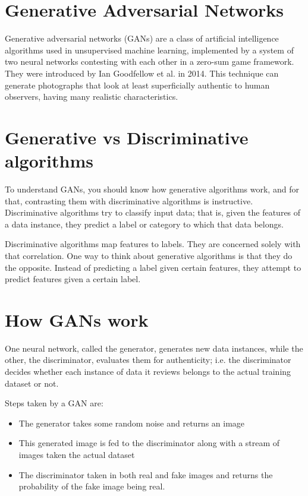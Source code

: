     \section{Generative Adversarial Networks}
    Generative adversarial networks (GANs) are a class of artificial intelligence 
    algorithms used in unsupervised machine learning, implemented by a system of 
    two neural networks contesting with each other in a zero-sum game framework. 
    They were introduced by Ian Goodfellow et al. in 2014\cite{base}. This technique 
    can generate photographs that look at least superficially authentic to human 
    observers, having many realistic characteristics.\cite{improvedtechniques}

    \section{Generative vs Discriminative algorithms}
    To understand GANs, you should know how generative algorithms work, and for 
    that, contrasting them with discriminative algorithms is instructive. 
    Discriminative algorithms try to classify input data; that is, given the 
    features of a data instance, they predict a label or category to which that 
    data belongs.


    Discriminative algorithms map features to labels. They are concerned solely 
    with that correlation. One way to think about generative algorithms is that 
    they do the opposite. Instead of predicting a label given certain features, 
    they attempt to predict features given a certain label.

    \section{How GANs work}

    One neural network, called the generator, generates new data instances, while 
    the other, the discriminator, evaluates them for authenticity; i.e. the 
    discriminator decides whether each instance of data it reviews belongs to the 
    actual training dataset or not.\cite{fourj}

    Steps taken by a GAN are:
    \begin{itemize}
    \item{The generator takes some random noise and returns an image}
    \item{This generated image is fed to the discriminator along with a stream of 
    images taken the actual dataset}
    \item{The discriminator taken in both real and fake images and returns the 
    probability of the fake image being real.}
\end{itemize}